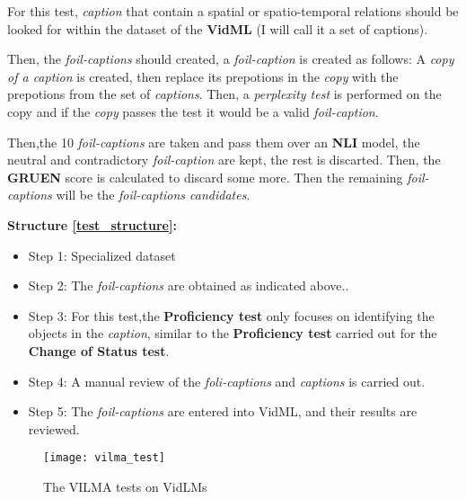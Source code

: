 For this test, \textit{caption} that contain a spatial or spatio-temporal relations should be looked for within the dataset of the \textbf{VidML} (I will call it a set of captions).

Then, the \textit{foil-captions} should created, a \textit{foil-caption} is created as follows:
A \textit{copy of a caption} is created, then replace its prepotions in the \textit{copy} with the prepotions from the set of \textit{captions}. Then, a \textit{perplexity test} is performed on the copy and if the \textit{copy} passes the test it would be a valid \textit{foil-caption}.

Then,the 10 \textit{foil-captions} are taken and pass them over an \textbf{NLI} model, the neutral and contradictory \textit{foil-caption} are kept, the rest is discarted. Then, the \textbf{GRUEN} score is calculated to discard some more.
Then the remaining \textit{foil-captions} will be the \textit{foil-captions candidates}.

\textbf{Structure \ref{test_structure}:}
\begin{itemize}
\item Step 1: Specialized dataset
\item Step 2: The \textit{foil-captions} are obtained as indicated above..
\item Step 3: For this test,the \textbf{Proficiency test} only focuses on identifying the objects in the \textit{caption}, similar to the \textbf{Proficiency test} carried out for the \textbf{Change of Status test}.
\item Step 4: A manual review of the \textit{foli-captions} and \textit{captions} is carried out.
\item Step 5: The \textit{foil-captions} are entered into VidML, and their results are reviewed.
\end{itemize}

\begin{figure}[h]
    \centering
    \texttt{[image: vilma\_test]}
    \caption{The VILMA tests on VidLMs}
    \label{fig:vilma_test}
\end{figure}